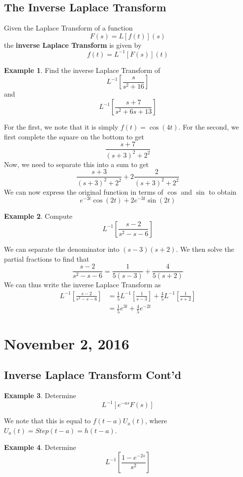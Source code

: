 \documentclass[11pt]{article}
\theoremstyle{plain} %
\theoremstyle{definition}
\theoremstyle{example}
\newtheorem*{example}{Example}
\theoremstyle{remark}
\begin{document}
\subsection{The Inverse Laplace Transform}
Given the Laplace Transform of a function $$F(s) = L[f(t)](s)$$ the \textbf{inverse Laplace Transform} is given by $$f(t) = L^{-1}[F(s)](t)$$
\begin{example}
Find the inverse Laplace Transform of $$L^{-1}\left[\frac{s}{s^2+16}\right]$$ and $$L^{-1}\left[\frac{s+7}{s^2+6s+13}\right]$$
\end{example}
For the first, we note that it is simply $f(t) = \cos(4t)$. For the second, we first complete the square on the bottom to get $$\frac{s+7}{(s+3)^2 + 2^2}$$ Now, we need to separate this into a sum to get $$\frac{s+3}{(s+3)^2 + 2^2} +2 \frac{2}{(s+3)^2 + 2^2}$$ We can now express the original function in terms of $\cos$ and $\sin$ to obtain $$e^{-3t}\cos(2t) + 2e^{-3t}\sin(2t)$$

\begin{example}
Compute $$L^{-1}\left[\frac{s-2}{s^2-s-6}\right]$$
\end{example}
We can separate the denominator into $(s-3)(s+2)$. We then solve the partial fractions to find that $$\frac{s-2}{s^2-s-6} = \frac{1}{5(s-3)} + \frac{4}{5(s+2)}$$ We can thus write the inverse Laplace Transform as 
\begin{align*}
L^{-1}\left[\frac{s-2}{s^2-s-6}\right] &= \frac{1}{5}L^{-1}\left[\frac{1}{s-3}\right] + \frac{4}{5}L^{-1}\left[\frac{1}{s+2}\right] \\
&= \frac{1}{5}e^{3t} + \frac{4}{5}e^{-2t}
\end{align*}

\section{November 2, 2016}
\subsection{Inverse Laplace Transform Cont'd}

\begin{example}
Determine $$L^{-1}\left[e^{-as}F(s)\right]$$
\end{example}

We note that this is equal to $f(t-a)U_a(t)$, where $U_a(t) = Step(t-a) = h(t-a)$.

\begin{example}
Determine $$L^{-1}\left[\frac{1-e^{-2s}}{s^2}\right]$$
\end{example}
\end{document}
